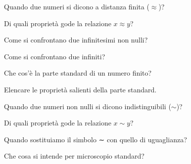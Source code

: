 \begin{multicols}{2}

\begin{esercizio}\label{ese:iper_021}
Quando due numeri si dicono a distanza finita (\(\approx\))?
\end{esercizio}

\begin{esercizio}\label{ese:iper_022}
Di quali proprietà gode la relazione \(x \approx y\)?
\end{esercizio}


\begin{esercizio}\label{ese:iper_024}
Come si confrontano due infinitesimi non nulli?
\end{esercizio}

\begin{esercizio}\label{ese:iper_025}
Come si confrontano due infiniti?
\end{esercizio}

\begin{esercizio}\label{ese:iper_026}
Che cos'è la parte standard di un numero finito?
\end{esercizio}

\begin{esercizio}\label{ese:iper_027}
Elencare le proprietà salienti della parte standard.
\end{esercizio}

\begin{esercizio}\label{ese:iper_028}
Quando due numeri non nulli si dicono indistinguibili (\(\sim\))?
\end{esercizio}

\begin{esercizio}\label{ese:iper_029}
Di quali proprietà gode la relazione \(x \sim y\)?
\end{esercizio}

\begin{esercizio}\label{ese:iper_030}
Quando sostituiamo il simbolo ∼ con quello di uguaglianza?
\end{esercizio}

\begin{esercizio}\label{ese:iper_031}
Che cosa si intende per microscopio standard?
\end{esercizio}


\end{multicols}
